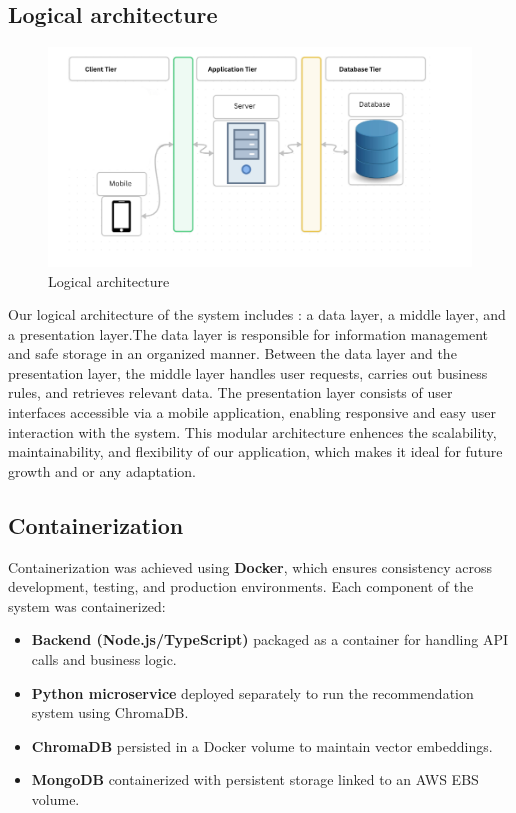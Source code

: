 \subsection{Logical architecture}

\begin{center}
\begin{figure}[ht]
            \centering
            \includegraphics[scale=0.44]{images/logic_arch.png}
            \caption{Logical architecture }
            \label{fig:Logical architecture of the system}
\end{figure}
\end{center}


Our logical architecture of the system includes : a data layer, a middle layer, and a presentation layer.The data layer is responsible for information management and safe storage in an organized manner. Between the data layer and the presentation layer, the middle layer handles user requests, carries out business rules, and retrieves relevant data. The presentation layer consists of user interfaces accessible via a mobile application, enabling responsive and easy user interaction with the system.
This modular architecture enhences the scalability, maintainability, and flexibility of our application, which makes it ideal for future growth and or any adaptation.

\subsection{Containerization}
Containerization was achieved using \textbf{Docker}, which ensures
consistency across development, testing, and production
environments. Each component of the system was containerized:
\begin{itemize}
    \item \textbf{Backend (Node.js/TypeScript)} packaged as a
    container for handling API calls and business logic.
    \item \textbf{Python microservice} deployed separately to run the
    recommendation system using ChromaDB.
    \item \textbf{ChromaDB} persisted in a Docker volume to maintain
    vector embeddings.
    \item \textbf{MongoDB} containerized with persistent storage
    linked to an AWS EBS volume.
\end{itemize}

